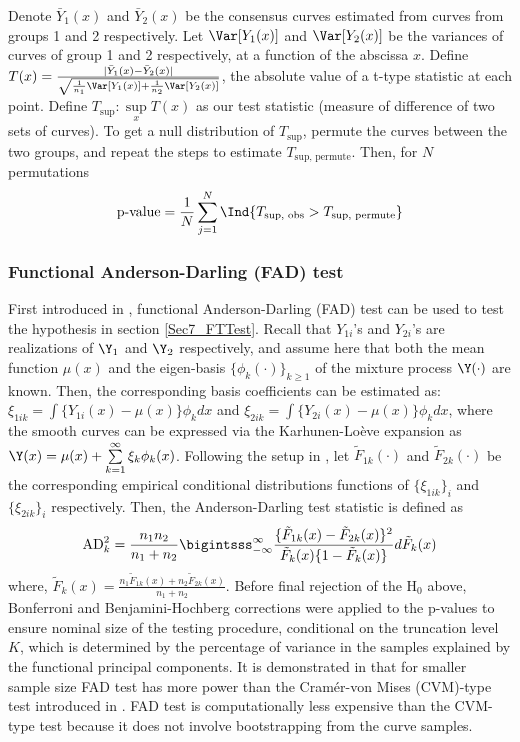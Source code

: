 Denote $\bar{Y}_1(x)$ and $\bar{Y}_2(x)$ be the consensus curves estimated from curves from groups 1 and 2 respectively. Let $\Var[Y_1(x)]$ and $\Var[Y_2(x)]$ be the variances of curves of group 1 and 2 respectively, at a function of the abscissa $x$. Define $T(x) = \frac{|\bar{Y}_1(x) - \bar{Y}_2(x)|}{\sqrt{\frac{1}{n_1}\Var[Y_1(x)] + \frac{1}{n_2}\Var[Y_2(x)]}}$, the absolute value of a t-type statistic at each point. Define $T_{\text{sup}}:  \sup\limits_{x} T(x)$ as our test statistic (measure of difference of two sets of curves). To get a null distribution of $T_{\text{sup}}$, permute the curves between the two groups, and repeat the steps to estimate $T_{\text{sup, permute}}$. Then, for $N$ permutations
\[  \text{p-value} = \frac{1}{N}\sum\limits_{j = 1}^{N}\Ind\{T_{\text{sup, obs}} > T_{\text{sup, permute}} \} \]

\subsubsection{Functional Anderson-Darling (FAD) test} \label{Sec7_FAD}
First introduced in \cite{Pomann_etal_2016_JRSSC}, functional Anderson-Darling (FAD) test can be used to test the hypothesis in section \ref{Sec7_FTTest}. Recall that $Y_{1i}$'s and $Y_{2i}$'s are realizations of $\Y_1$ and $\Y_2$ respectively, and assume here that both the mean function $\mu(x)$ and the eigen-basis $\{\phi_k(\cdot)\}_{k \ge 1}$ of the mixture process $\Y(\cdot)$ are known. Then, the corresponding basis coefficients can be estimated as: $\xi_{1ik} = \int \{Y_{1i}(x) - \mu(x) \}\phi_k dx$  and $\xi_{2ik} = \int \{Y_{2i}(x) - \mu(x) \}\phi_k dx$, where the smooth curves can be expressed via the Karhunen-Lo\`{e}ve expansion as $\Y(x) = \mu(x) + \sum\limits_{k = 1}^{\infty} \xi_k \phi_k(x)$. Following the setup in \cite{Pomann_etal_2016_JRSSC}, let $\tilde{F}_{1k}(\cdot)$ and $\tilde{F}_{2k}(\cdot)$ be the corresponding empirical conditional distributions functions of $\{\xi_{1ik}\}_i$ and $\{\xi_{2ik}\}_i$ respectively. Then, the Anderson-Darling test statistic is defined as
\[ \text{AD}_k^2 = \frac{n_1 n_2}{n_1 + n_2} \bigintsss_{-\infty}^{\infty} \frac{ \{\tilde{F}_{1k}(x) - \tilde{F}_{2k}(x)\}^2 }{ \tilde{F}_{k}(x)\{ 1 - \tilde{F}_{k}(x) \} } d\tilde{F}_{k}(x) \]
where, $\tilde{F}_{k}(x) = \frac{ n_1\tilde{F}_{1k}(x) + n_2\tilde{F}_{2k}(x) }{ n_1 + n_2 }$. Before final rejection of the $\text{H}_0$ above, Bonferroni and Benjamini-Hochberg corrections were applied to the p-values to ensure nominal size of the testing procedure, conditional on the truncation level $K$, which is determined by the percentage of variance in the samples explained by the functional principal components. It is demonstrated in \cite{Pomann_etal_2016_JRSSC} that for smaller sample size FAD test has more power than the Cram\'{e}r-von Mises (CVM)-type test introduced in \cite{Hall_etal_2007_StatSinica}. FAD test is computationally less expensive than the CVM-type test because it does not involve bootstrapping from the curve samples.

